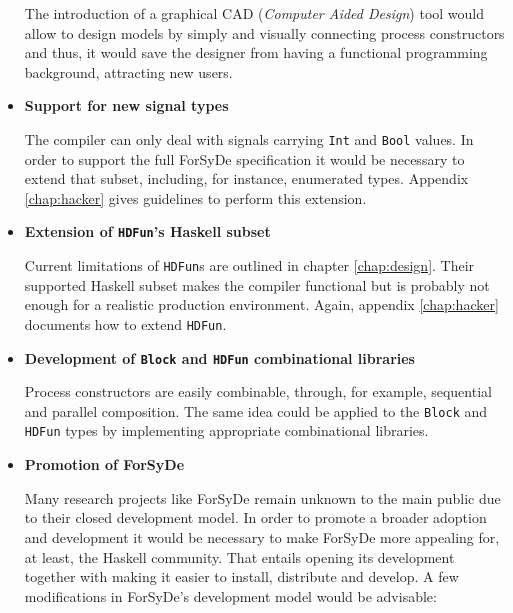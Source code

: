 \begin{itemize}
  The introduction of a graphical CAD (\textit{Computer Aided Design})
  tool would allow to design models by simply and visually connecting
  process constructors and thus, it would save the designer from
  having a functional programming background, attracting new users.
  

\item \textbf{Support for new signal types}

  The compiler can only deal with signals carrying \texttt{Int} and
  \texttt{Bool} values. In order to support the full ForSyDe
  specification \cite{forsyde:thesis} it would be necessary to extend
  that subset, including, for instance, enumerated types. Appendix
  \ref{chap:hacker} gives guidelines to perform this extension.

\item \textbf{Extension of \texttt{HDFun}'s Haskell subset}
  
  Current limitations of \texttt{HDFun}s are outlined in chapter
  \ref{chap:design}. Their supported Haskell subset makes the compiler
  functional but is probably not enough for a realistic production
  environment. Again, appendix \ref{chap:hacker} documents how to
  extend \texttt{HDFun}.
  

\item \textbf{Development of \texttt{Block} and \texttt{HDFun}
    combinational libraries}

  Process constructors are easily combinable, through, for example,
  sequential and parallel composition. The same idea could be applied
  to the \texttt{Block} and \texttt{HDFun} types by implementing
  appropriate combinational libraries.
  

\item \textbf{Promotion of ForSyDe} 

  Many research projects like ForSyDe remain unknown to the main public
  due to their closed development model.  In order to promote a
  broader adoption and development it would be necessary to make ForSyDe
  more appealing for, at least, the Haskell community. That entails
  opening its development together with making it easier to install,
  distribute and develop. A few modifications in ForSyDe's development
  model would be advisable:
  

\end{itemize}

